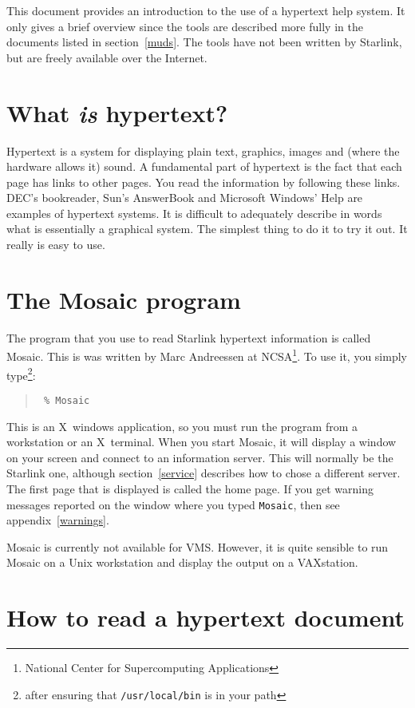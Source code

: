 This document provides an introduction to the use of a hypertext help
system. It only gives a brief overview since the tools are described more
fully in the documents listed in section~\ref{muds}. The tools have not been
written by Starlink, but are freely available over the Internet.

\section{What {\em is} hypertext?}

Hypertext is a system for displaying plain text, graphics, images and (where
the hardware allows it) sound. A fundamental part of hypertext is the fact that
each page has links to other pages. You read the information by following these
links. DEC's bookreader, Sun's AnswerBook and Microsoft Windows' Help are
examples of hypertext systems. It is difficult to adequately describe in words
what is essentially a graphical system. The simplest thing to do it to try it
out. It really is easy to use. 

\section{The Mosaic program}

The program that you use to read Starlink hypertext information is called
Mosaic. This is was written by Marc Andreessen at NCSA\footnote{National Center
for Supercomputing Applications}. To use it, you simply type\footnote{after
ensuring that {\tt /usr/local/bin} is in your path}: 

\begin{quote}{\tt
\% Mosaic
}
\end{quote}

This is an X~windows application, so you must run the program from a
workstation or an X~terminal. When you start Mosaic, it will display a window
on your screen and connect to an information server. This will normally be the
Starlink one, although section~\ref{service} describes how to chose a different
server. The first page that is displayed is called the home page. If you get
warning messages reported on the window where you typed {\tt Mosaic}, then see
appendix~\ref{warnings}.

Mosaic is currently not available for VMS. However, it is quite sensible to
run Mosaic on a Unix workstation and display the output on a VAXstation.

\section{How to read a hypertext document}

